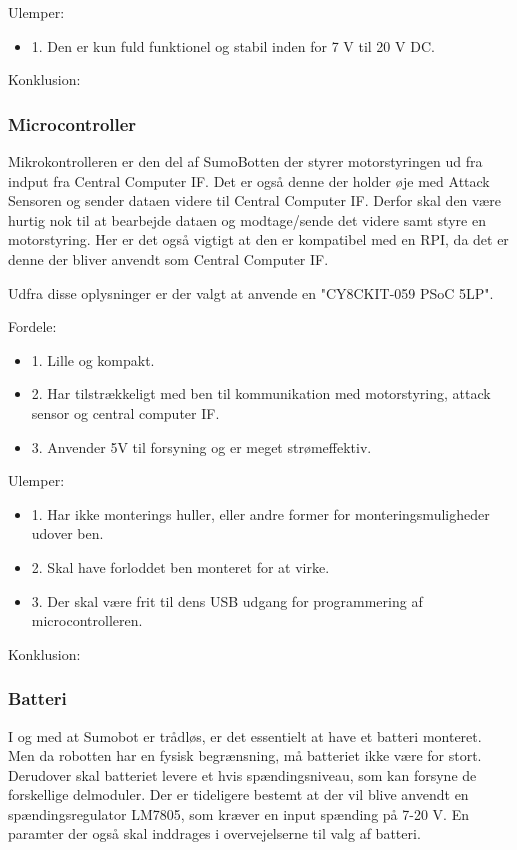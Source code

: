 Ulemper: 
\begin{itemize}
\item 1. Den er kun fuld funktionel og stabil inden for 7 V til 20 V DC.
\end{itemize}

Konklusion:


\subsubsection*{\textbf{Microcontroller}}
Mikrokontrolleren er den del af SumoBotten der styrer motorstyringen ud fra indput fra Central Computer IF. Det er også denne der holder øje med Attack Sensoren og sender dataen videre til Central Computer IF. Derfor skal den være hurtig nok til at bearbejde dataen og modtage/sende det videre samt styre en motorstyring. Her er det også vigtigt at den er kompatibel med en RPI, da det er denne der bliver anvendt som Central Computer IF. 

Udfra disse oplysninger er der valgt at anvende en "CY8CKIT-059 PSoC 5LP". 

Fordele: 
\begin{itemize}
\item 1. Lille og kompakt.
\item 2. Har tilstrækkeligt med ben til kommunikation med motorstyring, attack sensor og central computer IF.
\item 3. Anvender 5V til forsyning og er meget strømeffektiv.
\end{itemize}

Ulemper: 
\begin{itemize}
\item 1. Har ikke monterings huller, eller andre former for monteringsmuligheder udover ben.
\item 2. Skal have forloddet ben monteret for at virke.
\item 3. Der skal være frit til dens USB udgang for programmering af microcontrolleren. 
\end{itemize}

Konklusion:


\subsubsection*{\textbf{Batteri}}
I og med at Sumobot er trådløs, er det essentielt at have et batteri monteret. Men da robotten har en fysisk begrænsning, må batteriet ikke være for stort. Derudover skal batteriet levere et hvis spændingsniveau, som kan forsyne de forskellige delmoduler.
Der er tideligere bestemt at der vil blive anvendt en spændingsregulator LM7805, som kræver en input spænding på 7-20 V. En paramter der også skal inddrages i overvejelserne til valg af batteri.

